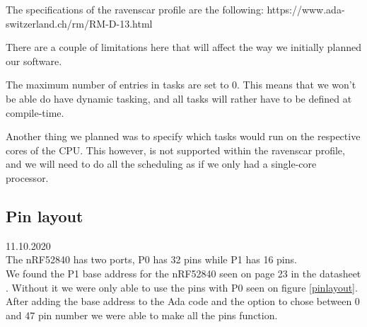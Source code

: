 \documentclass{article}
\begin{document}
The specifications of the ravenscar profile are the following:
https://www.ada-switzerland.ch/rm/RM-D-13.html

There are a couple of limitations here that will affect the way we initially planned our software. 

The maximum number of entries in tasks are set to 0. This means that we won't be able do have dynamic tasking, and all tasks will rather have to be defined at compile-time. 

Another thing we planned was to specify which tasks would run on the respective cores of the CPU. This however, is not supported within the ravenscar profile, and we will need to do all the scheduling as if we only had a single-core processor. 

\subsection{Pin layout}
11.10.2020\\
The nRF52840 has two ports, P0 has 32 pins while P1 has 16 pins.\\ 
We found the P1 base address for the nRF52840 seen on page 23 in the datasheet \cite{NRF52840}. Without it we were only able to use the pins with P0 seen on figure \ref{pinlayout}. After adding the base address to the Ada code and the option to chose between 0 and 47 pin number we were able to make all the pins function.
\end{document}
